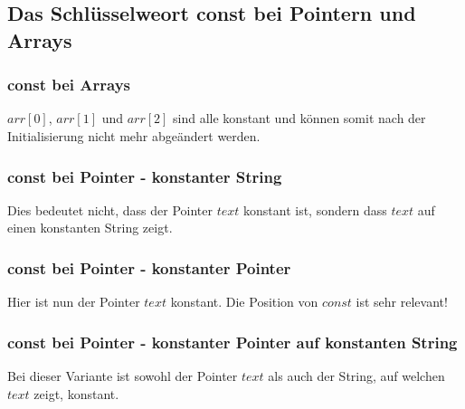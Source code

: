 	\subsection{Das Schlüsselweort const bei Pointern und Arrays }
		\begin{minipage}[t]{9 cm}
			\subsubsection{const bei Arrays}
				
				$arr[0]$, $arr[1]$ und $arr[2]$ sind alle konstant und können somit nach der Initialisierung nicht mehr abgeändert werden. \\
				
			\subsubsection{const bei Pointer - konstanter String}
				
				Dies bedeutet nicht, dass der Pointer $text$ konstant ist, sondern dass $text$ auf einen konstanten String zeigt.
		\end{minipage}
		\hspace*{0.5cm}
		\begin{minipage}[t]{9 cm}
			\subsubsection{const bei Pointer - konstanter Pointer}
				
				Hier ist nun der Pointer $text$ konstant. Die Position von $const$ ist sehr	relevant! \\
				
			\subsubsection{const bei Pointer - konstanter Pointer auf konstanten String}
				
				Bei dieser Variante ist sowohl der Pointer $text$ als auch der String, auf welchen $text$ zeigt, konstant. 
		\end{minipage} \\